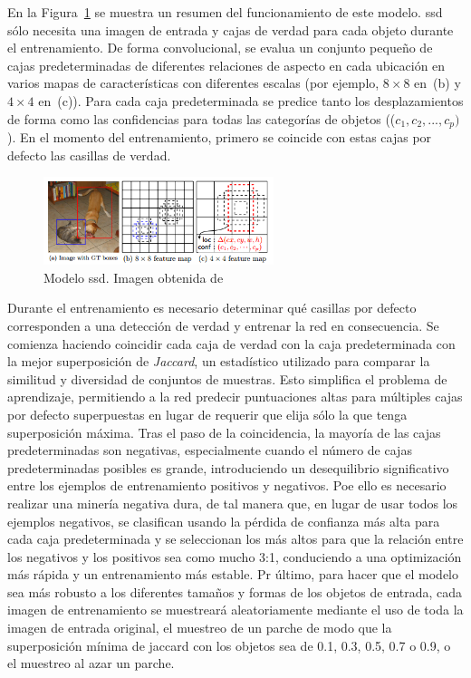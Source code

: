 En la Figura~\ref{fig.ssd} se muestra un resumen del funcionamiento de este modelo. \acrshort{ssd} sólo necesita una imagen de entrada y cajas de verdad para cada objeto durante el entrenamiento. De forma convolucional, se evalua un conjunto pequeño de cajas predeterminadas de diferentes relaciones de aspecto en cada ubicación en varios mapas de características con diferentes escalas (por ejemplo, $8\times8$ en~(b) y $4\times4$ en~(c)). Para cada caja predeterminada se predice tanto los desplazamientos de forma como las confidencias para todas las categorías de objetos (($c_1, c_2, ... , c_p)$). En el momento del entrenamiento, primero se coincide con estas cajas por defecto las casillas de verdad.

\begin{figure}[H]
	\begin{center}
		\includegraphics[width=0.6\textwidth]{figures/ssd}
		\caption{Modelo \acrshort{ssd}. Imagen obtenida de~\cite{2015arXiv151202325L}}
		\label{fig.ssd}
	\end{center}
\end{figure} 

Durante el entrenamiento es necesario determinar qué casillas por defecto corresponden a una detección de verdad y entrenar la red en consecuencia. Se comienza haciendo coincidir cada caja de verdad con la caja predeterminada con la mejor superposición de \textit{Jaccard}, un estadístico utilizado para comparar la similitud y diversidad de conjuntos de muestras. 
Esto simplifica el problema de aprendizaje, permitiendo a la red predecir puntuaciones altas para múltiples cajas por defecto superpuestas en lugar de requerir que elija sólo la que tenga superposición máxima. Tras el paso de la coincidencia, la mayoría de las cajas predeterminadas son negativas, especialmente cuando el número de cajas predeterminadas posibles es grande, introduciendo un desequilibrio significativo entre los ejemplos de entrenamiento positivos y negativos. Poe ello es necesario realizar una minería negativa dura, de tal manera que, en lugar de usar todos los ejemplos negativos, se clasifican usando la pérdida de confianza más alta para cada caja predeterminada y se seleccionan los más altos para que la relación entre los negativos y los positivos sea como mucho 3:1, conduciendo a una optimización más rápida y un entrenamiento más estable. Pr último, para hacer que el modelo sea más robusto a los diferentes tamaños y formas de los objetos de entrada, cada imagen de entrenamiento se muestreará aleatoriamente mediante el uso de toda la imagen de entrada original, el muestreo de un parche de modo que la superposición mínima de jaccard con los objetos sea de 0.1, 0.3,
0.5, 0.7 o 0.9, o el muestreo al azar un parche.\\

